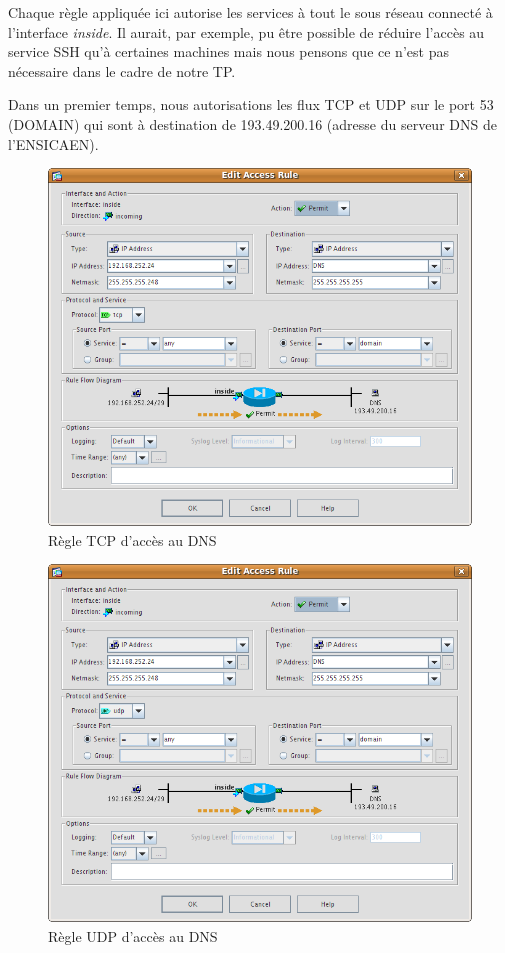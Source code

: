 \documentclass[a4paper,12pt]{article}
\begin{document}
Chaque règle appliquée ici autorise les services à tout le sous réseau connecté à l'interface \textit{inside}. Il aurait, par exemple, pu être possible de
réduire l'accès au service SSH qu'à certaines machines mais nous pensons que ce n'est pas nécessaire dans le cadre de notre TP.

Dans un premier temps, nous autorisations les flux TCP et UDP sur le port 53 (DOMAIN) qui sont à destination de 193.49.200.16 (adresse du serveur DNS de
l'ENSICAEN).

\begin{figure}[H]
	\center
	\includegraphics[width=13cm]{img/4-policyinsidednstcp.png}
	\caption{Règle TCP d'accès au DNS}
\end{figure}
\begin{figure}[H]
	\center
	\includegraphics[width=13cm]{img/5-policyinsidednsudp.png}
	\caption{Règle UDP d'accès au DNS}
\end{figure}
\end{document}
